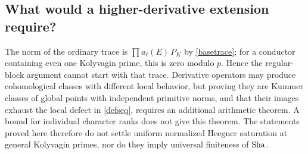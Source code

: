 \documentclass[11pt,a4paper]{article}
\numberwithin{equation}{section}
\begin{document}
\subsection{What would a higher-derivative extension require?}
The norm of the ordinary trace is $\prod a_\ell(E)\,P_K$ by \eqref{basetrace}; for a conductor containing even one Kolyvagin prime, this is zero modulo $p$. Hence the regular-block argument cannot start with that trace. Derivative operators may produce cohomological classes with different local behavior, but proving they are Kummer classes of global points with independent primitive norms, and that their images exhaust the local defect in \eqref{defseq}, requires an additional arithmetic theorem. A bound for individual character ranks does not give this theorem. The statements proved here therefore do not settle uniform normalized Heegner saturation at general Kolyvagin primes, nor do they imply universal finiteness of $\operatorname{Sha}$.
\end{document}
